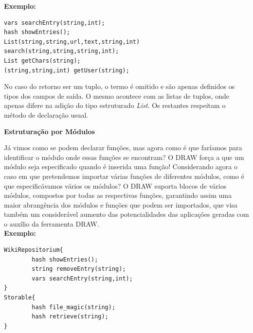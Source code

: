 \documentclass[a4paper]{article}
\begin{document}
\textbf{Exemplo:}

\begin{small}
\begin{lstlisting}
vars searchEntry(string,int);
hash showEntries();
List(string,string,url,text,string,int) search(string,string,string,int);
List getChars(string);
(string,string,int) getUser(string);
\end{lstlisting}
\end{small}

\vspace{.2cm}

\hspace{1cm}No caso do retorno ser um tuplo, o termo é omitido e são apenas definidos os tipos dos campos de saída. O mesmo acontece com
as listas de tuplos, onde apenas difere na adição do tipo estruturado \emph{List}. Os restantes respeitam o método de declaração usual.\\

\begin{normalsize}
\textbf{Estruturação por Módulos}\\
\end{normalsize}

\hspace{1cm}Já vimos como se podem declarar funções, mas agora como é que faríamos para identificar o módulo onde essas funções se
encontram? O DRAW força a que um módulo seja especificado quando é inserida uma função! Considerando agora o caso em que pretendemos
importar várias funções de diferentes módulos, como é que especificávamos vários os módulos? O DRAW suporta blocos de vários módulos,
compostos por todas as respectivas funções, garantindo assim uma maior abrangência dos módulos e funções que podem ser importados, que
visa também um considerável aumento das potencialidades das aplicações geradas com o auxílio da ferramenta DRAW.\\

\textbf{Exemplo:}

\begin{small}
\begin{lstlisting}
WikiRepositorium{
        hash showEntries();
        string removeEntry(string);
        vars searchEntry(string,int);
}
Storable{
        hash file_magic(string);
        hash retrieve(string);
}
\end{lstlisting}
\end{small}

\vspace{.2cm}
\end{document}
